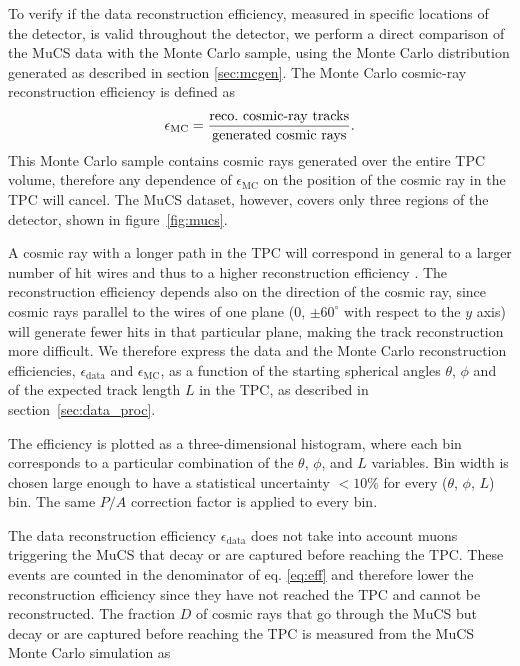 \documentclass[a4paper,11pt]{article}
\def\myhyphen{{\hbox{-}}}
\begin{document}
To verify if the data reconstruction efficiency, measured in specific locations of the detector, is valid throughout the detector, we perform a direct comparison of the MuCS data with the Monte Carlo sample, using the Monte Carlo distribution generated as described in section \ref{sec:mcgen}.
The Monte Carlo cosmic-ray reconstruction efficiency is defined as
\begin{equation}
  \epsilon_{\mathrm{MC}} = \frac{\mathrm{reco.~cosmic\myhyphen ray~tracks}}{\mathrm{generated~cosmic~rays}}.
\end{equation}
This Monte Carlo sample contains cosmic rays generated over the entire TPC volume, therefore  any dependence of $\epsilon_{\mathrm{MC}}$ on the position of the cosmic ray in the TPC will cancel. The MuCS dataset, however, covers only three regions of the detector, shown in figure~\ref{fig:mucs}. %

A cosmic ray with a longer path in the TPC will correspond in general to a larger number of hit wires and thus to a higher reconstruction efficiency \cite{pandora2}. The reconstruction efficiency depends also on the direction of the cosmic ray, since cosmic rays parallel to the wires of one plane (0, $\pm60^{\circ}$ with respect to the $y$ axis) will generate fewer hits in that particular plane, making the track reconstruction more difficult.
We therefore express the data and the Monte Carlo reconstruction efficiencies, $\epsilon_{\mathrm{data}}$ and $\epsilon_{\mathrm{MC}}$, as a function of the starting spherical angles $\theta$, $\phi$ and of the expected track length $L$ in the TPC, as described in section~\ref{sec:data_proc}.

The efficiency is plotted as a three-dimensional histogram, where each bin corresponds to a particular combination of the $\theta$, $\phi$, and $L$ variables. Bin width is chosen large enough to have a statistical uncertainty $<10\%$ for every ($\theta$, $\phi$, $L$) bin. The same $P/A$ correction factor is applied to every bin.

The data reconstruction efficiency $\epsilon_{\mathrm{data}}$ does not take into account muons triggering the MuCS that decay or are captured before reaching the TPC. These events are counted in the denominator of eq. \eqref{eq:eff} and therefore lower the reconstruction efficiency since they have not reached the TPC and cannot be reconstructed. The fraction $D$ of cosmic rays that go through the MuCS but decay or are captured before reaching the TPC is measured from the MuCS Monte Carlo simulation as
\end{document}
